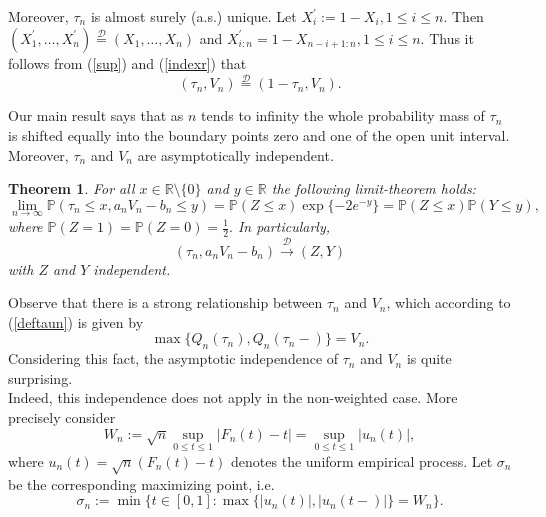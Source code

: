 \documentclass[sn-mathphys,Numbered]{sn-jnl}%
\theoremstyle{thmstyleone}%
\newtheorem{theorem}{Theorem}%
\theoremstyle{thmstyletwo}%
\theoremstyle{thmstylethree}%
\begin{document}
\vspace{0.4cm}
Moreover, $\tau_n$ is almost surely (a.s.) unique. Let $X_i^\prime :=1-X_i, 1 \le i \le n.$ Then $(X_1^\prime,\ldots,X_n^\prime) \stackrel{\mathcal{D}}{=} (X_1,\ldots,X_n)$ and $X_{i:n}^\prime = 1-X_{n-i+1:n}, 1 \le i \le n.$ Thus it follows from (\ref{sup}) and (\ref{indexr}) that
\begin{equation} \label{symmetric}
 (\tau_n,V_n) \stackrel{\mathcal{D}}{=} (1 - \tau_n,V_n).
\end{equation}

\vspace{0.4cm}
Our main result says that as $n$ tends to infinity the whole probability mass of $\tau_n$ is shifted equally into the boundary points zero and one of the
open unit interval. Moreover, $\tau_n$ and $V_n$ are asymptotically independent.\\

\begin{theorem} \label{Thm} For all $x \in \mathbb{R} \setminus \{0\}$ and $y \in \mathbb{R}$ the following limit-theorem holds:
\begin{equation} \label{limthm}
 \lim_{n \rightarrow \infty} \mathbb{P}(\tau_n \le x, a_n V_n -b_n \le y) = \mathbb{P}(Z \le x) \exp\{-2 e^{-y}\}= \mathbb{P}(Z \le x) \mathbb{P}(Y \le y),
\end{equation}
where $\mathbb{P}(Z=1)=\mathbb{P}(Z=0)=\frac{1}{2}.$
In particularly,  $$(\tau_n,a_n V_n-b_n) \stackrel{\mathcal{D}}{\rightarrow} (Z,Y)$$
with $Z$ and $Y$ independent.
\end{theorem}

\vspace{0.3cm}
Observe that there is a strong relationship between $\tau_n$ and $V_n$, which according to (\ref{deftaun}) is given by
$$
  \max\{Q_n(\tau_n),Q_n(\tau_n-)\} = V_n.
$$
Considering this fact, the asymptotic independence of $\tau_n$ and $V_n$ is quite surprising.\\

Indeed, this independence does not apply in the non-weighted case. More precisely consider
$$
W_n:= \sqrt{n} \sup_{0 \le t \le 1} |F_n(t)-t|= \sup_{0 \le t \le 1}|u_n(t)|,
$$
where $u_n(t) = \sqrt{n}(F_n(t)-t)$ denotes the uniform empirical process. Let $\sigma_n$ be the corresponding maximizing point, i.e.
$$
 \sigma_n:=\min \{t \in [0,1]: \max\{|u_n(t)|,|u_n(t-)|\}= W_n\}.
$$
\end{document}
